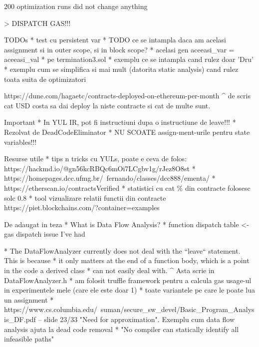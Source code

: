 200 optimization runs did not change anything

> DISPATCH GAS!!!







TODOs
* test cu persistent var
* TODO ce se intampla daca am acelasi assignment si in outer scope, si in block scope?
* acelasi gen aceeasi_var = aceeasi_val
* pe termination3.sol
  * exemplu ce se intampla cand rulez doar 'Dru'
  * exemplu cum se simplifica si mai mult (datorita static analysis) cand rulez toata suita de optimizatori



  https://dune.com/hagaetc/contracts-deployed-on-ethereum-per-month
  ^ de scris cat USD costa sa dai deploy la niste contracte si cat de multe sunt.


Important
* In YUL IR, pot fi instructiuni dupa o instructiune de leave!!!
  * Rezolvat de DeadCodeEliminator
* NU SCOATE assign-ment-urile pentru state variables!!!


Resurse utile
* tips n tricks cu YULs, poate e ceva de folos: https://hackmd.io/@gn56kcRBQc6mOi7LCgbv1g/rJez8O8st
* https://homepages.dcc.ufmg.br/~fernando/classes/dcc888/ementa/
* https://etherscan.io/contractsVerified
  * statistici cu cat \% din contracte folosesc solc 0.8
* tool vizualizare relatii functii din contracte https://piet.blockchains.com/?container=examples%


De adaugat in teza
* What is Data Flow Analysis?
* function dispatch table <- gas dispatch issue I've had

  * The DataFlowAnalyzer currently does not deal with the ``leave`` statement. This is because
  * it only matters at the end of a function body, which is a point in the code a derived class
  * can not easily deal with.
  ^ Asta scrie in DataFlowAnalyzer.h
* am folosit truffle framework pentru a calcula gas usage-ul in experimentele mele (care ele este doar 1)
* toate variantele pe care le poate lua un assignment
* https://www.cs.columbia.edu/~suman/secure_sw_devel/Basic_Program_Analysis_DF.pdf – slide 23/33 "Need for approximation". Exemplu cum data flow analysis ajuta la dead code removal
  * "No compiler can statically identify all infeasible paths"



